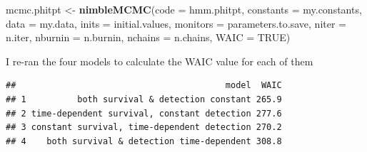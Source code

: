\documentclass[
  12pt,
]{krantz}
\newenvironment{Shaded}{\begin{snugshade}}{\end{snugshade}}
\newcommand{\AttributeTok}[1]{\textcolor[rgb]{0.13,0.29,0.53}{#1}}
\newcommand{\ConstantTok}[1]{\textcolor[rgb]{0.56,0.35,0.01}{#1}}
\newcommand{\FunctionTok}[1]{\textcolor[rgb]{0.13,0.29,0.53}{\textbf{#1}}}
\newcommand{\NormalTok}[1]{#1}
\newcommand{\OtherTok}[1]{\textcolor[rgb]{0.56,0.35,0.01}{#1}}
\newcommand{\SpecialCharTok}[1]{\textcolor[rgb]{0.81,0.36,0.00}{\textbf{#1}}}
\newcommand{\StringTok}[1]{\textcolor[rgb]{0.31,0.60,0.02}{#1}}
\begin{document}
\begin{Shaded}
\begin{Highlighting}[]
\NormalTok{mcmc.phitpt }\OtherTok{\textless{}{-}} \FunctionTok{nimbleMCMC}\NormalTok{(}\AttributeTok{code =}\NormalTok{ hmm.phitpt,}
                          \AttributeTok{constants =}\NormalTok{ my.constants,}
                          \AttributeTok{data =}\NormalTok{ my.data,}
                          \AttributeTok{inits =}\NormalTok{ initial.values,}
                          \AttributeTok{monitors =}\NormalTok{ parameters.to.save,}
                          \AttributeTok{niter =}\NormalTok{ n.iter,}
                          \AttributeTok{nburnin =}\NormalTok{ n.burnin,}
                          \AttributeTok{nchains =}\NormalTok{ n.chains,}
                          \AttributeTok{WAIC =} \ConstantTok{TRUE}\NormalTok{) }
\end{Highlighting}
\end{Shaded}

I re-ran the four models to calculate the WAIC value for each of them

\begin{Shaded}
\end{Shaded}

\begin{verbatim}
##                                         model  WAIC
## 1          both survival & detection constant 265.9
## 2 time-dependent survival, constant detection 277.6
## 3 constant survival, time-dependent detection 270.2
## 4    both survival & detection time-dependent 308.8
\end{verbatim}
\end{document}
